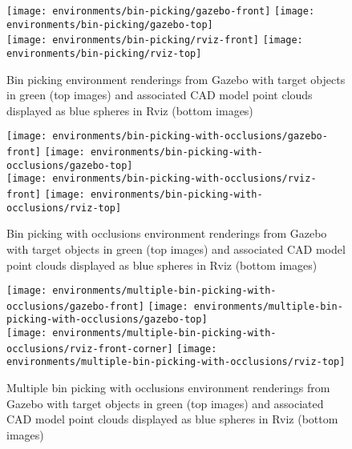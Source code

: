 \begin{figure}
	\centering
	\texttt{[image: environments/bin-picking/gazebo-front]}
	\texttt{[image: environments/bin-picking/gazebo-top]}\\
	\texttt{[image: environments/bin-picking/rviz-front]}
	\texttt{[image: environments/bin-picking/rviz-top]}
	\caption{Bin picking environment renderings from Gazebo with target objects in green (top images) and associated CAD model point clouds displayed as blue spheres in Rviz (bottom images)}
\end{figure}

\begin{figure}
	\centering
	\texttt{[image: environments/bin-picking-with-occlusions/gazebo-front]}
	\texttt{[image: environments/bin-picking-with-occlusions/gazebo-top]}\\
	\texttt{[image: environments/bin-picking-with-occlusions/rviz-front]}
	\texttt{[image: environments/bin-picking-with-occlusions/rviz-top]}
	\caption{Bin picking with occlusions environment renderings from Gazebo with target objects in green (top images) and associated CAD model point clouds displayed as blue spheres in Rviz (bottom images)}
\end{figure}

\begin{figure}
	\centering
	\texttt{[image: environments/multiple-bin-picking-with-occlusions/gazebo-front]}
	\texttt{[image: environments/multiple-bin-picking-with-occlusions/gazebo-top]}\\
	\texttt{[image: environments/multiple-bin-picking-with-occlusions/rviz-front-corner]}
	\texttt{[image: environments/multiple-bin-picking-with-occlusions/rviz-top]}
	\caption{Multiple bin picking with occlusions environment renderings from Gazebo with target objects in green (top images) and associated CAD model point clouds displayed as blue spheres in Rviz (bottom images)}
\end{figure}
